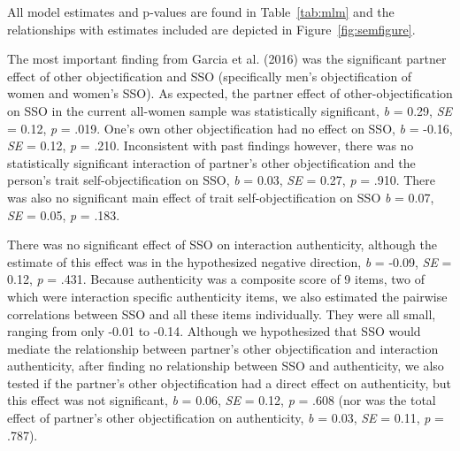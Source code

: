 \documentclass[man]{apa6}
\begin{document}
All model estimates and p-values are found in Table~\ref{tab:mlm} and
the relationships with estimates included are depicted in
Figure~\ref{fig:semfigure}.

The most important finding from Garcia et al. (2016) was the significant
partner effect of other objectification and SSO (specifically men's
objectification of women and women's SSO). As expected, the partner
effect of other-objectification on SSO in the current all-women sample
was statistically significant, \emph{b} = 0.29, \emph{SE} = 0.12,
\emph{p} = .019. One's own other objectification had no effect on SSO,
\emph{b} = -0.16, \emph{SE} = 0.12, \emph{p} = .210. Inconsistent with
past findings however, there was no statistically significant
interaction of partner's other objectification and the person's trait
self-objectification on SSO, \emph{b} = 0.03, \emph{SE} = 0.27, \emph{p}
= .910. There was also no significant main effect of trait
self-objectification on SSO \emph{b} = 0.07, \emph{SE} = 0.05, \emph{p}
= .183.

There was no significant effect of SSO on interaction authenticity,
although the estimate of this effect was in the hypothesized negative
direction, \emph{b} = -0.09, \emph{SE} = 0.12, \emph{p} = .431. Because
authenticity was a composite score of 9 items, two of which were
interaction specific authenticity items, we also estimated the pairwise
correlations between SSO and all these items individually. They were all
small, ranging from only -0.01 to -0.14. Although we hypothesized that
SSO would mediate the relationship between partner's other
objectification and interaction authenticity, after finding no
relationship between SSO and authenticity, we also tested if the
partner's other objectification had a direct effect on authenticity, but
this effect was not significant, \emph{b} = 0.06, \emph{SE} = 0.12,
\emph{p} = .608 (nor was the total effect of partner's other
objectification on authenticity, \emph{b} = 0.03, \emph{SE} = 0.11,
\emph{p} = .787).
\end{document}
